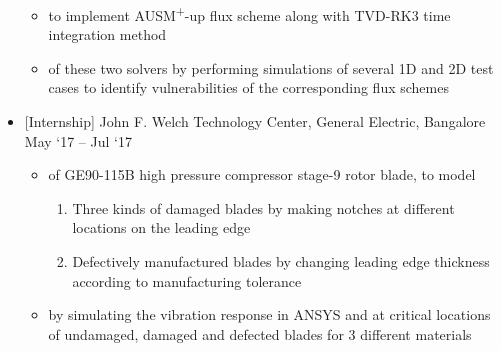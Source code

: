 \documentclass[a4paper,10pt]{article}
\newcommand{\apup}{AUSM\textsuperscript{+}-up}
\begin{document}
\begin{itemize}
\begin{itemize}
		\item {} to implement \apup{} flux scheme along with TVD-RK3 time integration method
		\item {} of these two solvers by performing simulations of several 1D and 2D test cases to identify vulnerabilities of the corresponding flux schemes\\
	\end{itemize}
	\item {}
	[Internship]
	{John F. Welch Technology Center, General Electric, Bangalore}
	{May `17 -- Jul `17}
	\begin{itemize}
	\item {} of GE90-115B high pressure compressor stage-9 rotor blade, to model
	\begin{enumerate}
		\item Three kinds of damaged blades by making notches at different locations on the leading edge
		\item Defectively manufactured blades by changing leading edge thickness according to manufacturing tolerance
	\end{enumerate}
	\item {} by simulating the vibration response in ANSYS and  at critical locations of undamaged, damaged and defected blades for 3 different materials
	\end{itemize}
\end{itemize}
\end{document}
